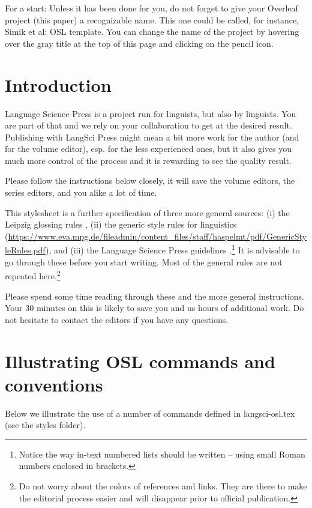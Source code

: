 \noindent For a start: Unless it has been done for you, do not forget to give your Overleaf project (this paper) a recognizable name. This one could be called, for instance, Simik et al: OSL template. You can change the name of the project by hovering over the gray title at the top of this page and clicking on the pencil icon.

\section{Introduction}\label{sim:sec:intro}

Language Science Press is a project run for linguists, but also by linguists. You are part of that and we rely on your collaboration to get at the desired result. Publishing with LangSci Press might mean a bit more work for the author (and for the volume editor), esp. for the less experienced ones, but it also gives you much more control of the process and it is rewarding to see the quality result.

Please follow the instructions below closely, it will save the volume editors, the series editors, and you alike a lot of time.

\sloppy This stylesheet is a further specification of three more general sources: (i) the Leipzig glossing rules \citep{Bickel.etal2015}, (ii) the generic style rules for linguistics (\url{https://www.eva.mpg.de/fileadmin/content_files/staff/haspelmt/pdf/GenericStyleRules.pdf}), and (iii) the Language Science Press guidelines \citep{Nordhoff.Muller2020}.\footnote{Notice the way in-text numbered lists should be written -- using small Roman numbers enclosed in brackets.} It is advisable to go through these before you start writing. Most of the general rules are not repeated here.\footnote{Do not worry about the colors of references and links. They are there to make the editorial process easier and will disappear prior to official publication.}

Please spend some time reading through these and the more general instructions. Your 30 minutes on this is likely to save you and us hours of additional work. Do not hesitate to contact the editors if you have any questions.

\section{Illustrating OSL commands and conventions}\label{sim:sec:osl-comm}

Below we illustrate the use of a number of commands defined in langsci-osl.tex (see the styles folder).

